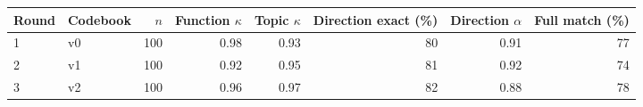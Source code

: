 \begin{tabular}{llrrrrrr}
\toprule
Round & Codebook & $n$ & Function $\kappa$ & Topic $\kappa$ & Direction exact (\%) & Direction $\alpha$ & Full match (\%) \\
\midrule
1 & v0 & 100 & 0.98 & 0.93 & 80 & 0.91 & 77 \\
2 & v1 & 100 & 0.92 & 0.95 & 81 & 0.92 & 74 \\
3 & v2 & 100 & 0.96 & 0.97 & 82 & 0.88 & 78 \\
\bottomrule
\end{tabular}
